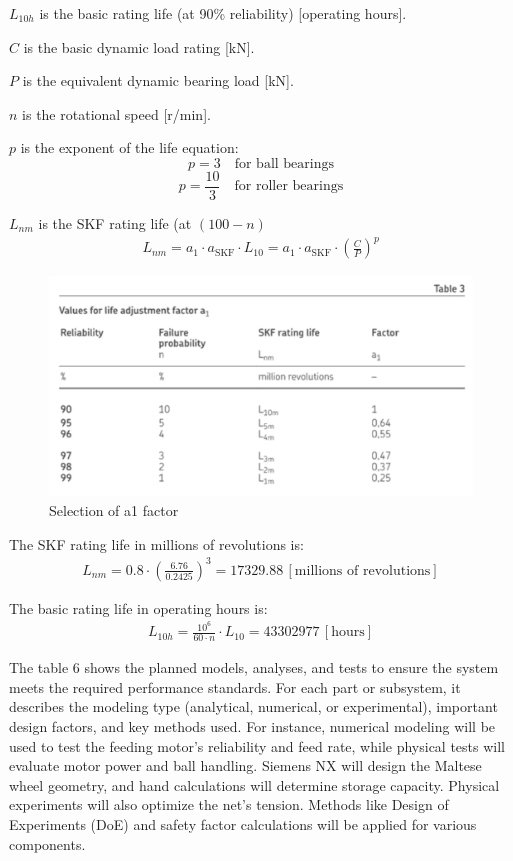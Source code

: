 \documentclass[12pt]{article}
\begin{document}
\( L_{10h} \) is the basic rating life (at 90\% reliability) [operating hours].

\( C \) is the basic dynamic load rating [kN].

\( P \) is the equivalent dynamic bearing load [kN].

\( n \) is the rotational speed [r/min].

\( p \) is the exponent of the life equation:
\[
p = 3 \quad \text{for ball bearings}
\]
\[
p = \frac{10}{3} \quad \text{for roller bearings}
\]

\( L_{nm} \) is the SKF rating life (at \( (100 - n) \)%
\begin{align}
L_{nm} = a_1 \cdot a_{\text{SKF}} \cdot L_{10} = a_1 \cdot a_{\text{SKF}} \cdot \left( \frac{C}{P} \right)^p
\end{align}

\begin{figure}[h!]
    \centering
    \includegraphics[width=0.5\linewidth]{table3.png}
    \caption{Selection of a1 factor}
    \label{fig:enter-label}
\end{figure}

The SKF rating life in millions of revolutions is:
\begin{align}
L_{nm} = 0.8 \cdot \left( \frac{6.76}{0.2425} \right)^3 = 17329.88 \, [\text{millions of revolutions}]
\end{align}

The basic rating life in operating hours is:
\begin{align}
L_{10h} = \frac{10^6}{60 \cdot n} \cdot L_{10} = 43302977 \, [\text{hours}]
\end{align}
 
The table 6 shows the planned models, analyses, and tests to ensure the system meets the required performance standards. For each part or subsystem, it describes the modeling type (analytical, numerical, or experimental), important design factors, and key methods used.  For instance, numerical modeling will be used to test the feeding motor’s reliability and feed rate, while physical tests will evaluate motor power and ball handling. Siemens NX will design the Maltese wheel geometry, and hand calculations will determine storage capacity. Physical experiments will also optimize the net’s tension. Methods like Design of Experiments (DoE) and safety factor calculations will be applied for various components. 
\end{document}
